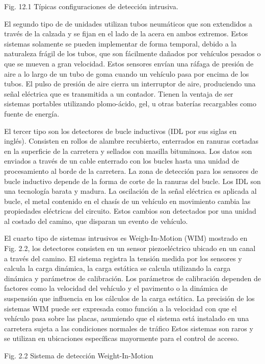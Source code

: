 \documentclass[final,fmstyle]{fpunathesis}
\begin{document}
Fig. 12.1 Típicas configuraciones de detección intrusiva.

El segundo tipo de de unidades utilizan tubos neumáticos que son extendidos a través de la calzada y se fijan en el lado de la acera en ambos extremos. Estos sistemas solamente se pueden implementar de forma temporal, debido a la naturaleza frágil de los tubos, que son fácilmente dañados por vehículos pesados o que se mueven a gran velocidad. Estos sensores envían una ráfaga de presión de aire a lo largo de un tubo de goma cuando un vehículo pasa por encima de los tubos. El pulso de presión de aire cierra un interruptor de aire, produciendo una señal eléctrica que es transmitida a un contador. Tienen la ventaja de ser sistemas portables utilizando plomo-ácido, gel, u otras baterías recargables como fuente de energía.

El tercer tipo son los detectores de bucle inductivos (IDL por sus siglas en inglés). Consisten en rollos de alambre recubierto, enterrados en ranuras cortadas en la superficie de la carretera y sellados con masilla bituminosa. Los datos son enviados a través de un cable enterrado con los bucles hasta una unidad de procesamiento al borde de la carretera. La zona de detección para los sensores de bucle inductivo depende de la forma de corte de la ranuras del bucle. Los IDL son una tecnología barata y madura. La oscilación de la señal eléctrica es aplicada al bucle, el metal contenido en el chasís de un vehículo en movimiento cambia las propiedades eléctricas del circuito. Estos cambios son detectados por una unidad al costado del camino, que disparan un evento de vehículo.

El cuarto tipo de sistemas intrusivos es Weigh-In-Motion (WIM) mostrado en Fig. 2.2, los detectores consisten en un sensor piezoeléctrico ubicado en un canal a través del camino. El sistema registra la tensión medida por los sensores y calcula la carga dinámica, la carga estática se calcula utilizando la carga dinámica y parámetros de calibración. Los parámetros de calibración dependen de factores como la velocidad del vehículo y el pavimento o la dinámica de suspensión que influencia en los cálculos de la carga estática. La precisión de los sistemas WIM puede ser expresada como función a la velocidad con que el vehículo pasa sobre las placas, asumiendo que el sistema está instalado en una carretera sujeta a las condiciones normales de tráfico Estos sistemas son raros y se utilizan en ubicaciones específicas mayormente para el control de acceso.

Fig. 2.2 Sistema de detección Weight-In-Motion
\end{document}
